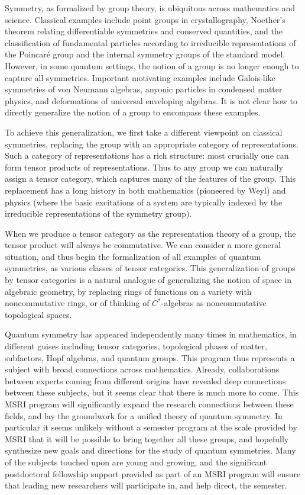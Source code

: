 \documentclass[12pt]{article}
\begin{document}
Symmetry, as formalized by group theory, is ubiquitous across mathematics and science. Classical examples include point groups in crystallography, Noether's theorem relating differentiable symmetries and conserved quantities, and the classification of fundamental particles according to irreducible representations of the Poincar\'e group and the internal symmetry groups of the standard model. However, in some quantum settings, the notion of a group is no longer enough to capture all symmetries.  Important motivating examples include Galois-like symmetries of von Neumann algebras, anyonic particles in condensed matter physics, and deformations of universal enveloping algebras. It is not clear how to directly generalize the notion of a group to encompass these examples.

To achieve this generalization, we first take a different viewpoint on classical symmetries, replacing the group with an appropriate category of representations.  Such a category of representations has a rich structure: most crucially one can form tensor products of representations.  Thus to any group we can naturally assign a tensor category, which captures many of the features of the group. This replacement has a long history in both mathematics (pioneered by Weyl) and physics (where the basic excitations of a system are typically indexed by the irreducible representations of the symmetry group).

When we produce a tensor category as the representation theory of a group, the tensor product will always be commutative. We can consider a more general situation, and thus begin the formalization of all examples of quantum symmetries, as various classes of tensor categories.  This generalization of groups by tensor categories is a natural analogue of generalizing the notion of space in algebraic geometry, by replacing rings of functions on a variety with noncommutative rings, or of thinking of $C^*$-algebras as noncommutative topological spaces.

Quantum symmetry has appeared independently many times in mathematics, in different guises including tensor categories, topological phases of matter, subfactors, Hopf algebras, and quantum groups. This program thus represents a subject with broad connections across mathematics. Already, collaborations between experts coming from different origins have revealed deep connections between these subjects, but it seems clear that there is much more to come. This MSRI program will significantly expand the research connections between these fields, and lay the groundwork for a unified theory of quantum symmetry. In particular it seems unlikely without a semester program at the scale provided by MSRI that it will be possible to bring together all these groups, and hopefully synthesize new goals and directions for the study of quantum symmetries. Many of the subjects touched upon are young and growing, and the significant postdoctoral fellowship support provided as part of an MSRI program will ensure that leading new researchers will participate in, and help direct, the semester.
\end{document}
